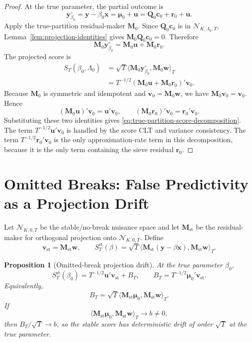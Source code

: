 \documentclass[12pt]{article}
\numberwithin{equation}{section}
\newtheorem{proposition}{Proposition}
\theoremstyle{definition}
\newcommand{\N}{\mathcal N}
\newcommand{\innerT}[2]{\langle #1,#2\rangle_T}
\begin{document}
\begin{proof}
At the true parameter, the partial outcome is
\[
    \bm y_{\beta_0}^\circ
    =\bm y-\beta_0\bm x
    =\bm\mu_0+\bm u
    =\bm Q_0\bm c_0+\bm r_0+\bm u.
\]
Apply the true-partition residual-maker \(\bm M_0\). Since \(\bm Q_0\bm c_0\) is
in \(\N_{K,\Lambda_0,T}\), Lemma~\ref{lem:projection-identities} gives
\(\bm M_0\bm Q_0\bm c_0=0\). Therefore
\[
    \bm M_0\bm y_{\beta_0}^\circ
    =\bm M_0\bm u+\bm M_0\bm r_0.
\]
The projected score is
\[
\begin{aligned}
    S_T(\beta_0,\Lambda_0)
    &=\sqrt T\innerT{\bm M_0\bm y_{\beta_0}^\circ}{\bm M_0\bm w} \\
    &=T^{-1/2}(\bm M_0\bm u+\bm M_0\bm r_0)'\bm v_0.
\end{aligned}
\]
Because \(\bm M_0\) is symmetric and idempotent and \(\bm v_0=\bm M_0\bm w\),
we have \(\bm M_0\bm v_0=\bm v_0\). Hence
\[
    (\bm M_0\bm u)'\bm v_0=\bm u'\bm v_0,
    \qquad
    (\bm M_0\bm r_0)'\bm v_0=\bm r_0'\bm v_0.
\]
Substituting these two identities gives
\eqref{eq:true-partition-score-decomposition}. The term
\(T^{-1/2}\bm u'\bm v_0\) is handled by the score CLT and variance consistency.
The term \(T^{-1/2}\bm r_0'\bm v_0\) is the only approximation-rate term in this
decomposition, because it is the only term containing the sieve residual
\(\bm r_0\).
\end{proof}
\section{Omitted Breaks: False Predictivity as a Projection Drift}

Let \(\N_{K,0,T}\) be the stable/no-break nuisance space and let
\(\bm M_{\mathrm{st}}\) be the residual-maker for orthogonal projection onto
\(\N_{K,0,T}\). Define
\[
    \bm v_{\mathrm{st}}=\bm M_{\mathrm{st}}\bm w,
    \qquad
    S_T^{\mathrm{st}}(\beta)
    =\sqrt T\innerT{\bm M_{\mathrm{st}}(\bm y-\beta\bm x)}
                         {\bm M_{\mathrm{st}}\bm w}.
\]

\begin{proposition}[Omitted-break projection drift]
\label{prop:omitted-break-projection-drift}
At the true parameter \(\beta_0\),
\begin{equation}
    S_T^{\mathrm{st}}(\beta_0)
    =
    T^{-1/2}\bm u'\bm v_{\mathrm{st}}
    +B_T,
    \qquad
    B_T=T^{-1/2}\bm\mu_0'\bm v_{\mathrm{st}}.
    \label{eq:stable-score-drift-decomposition}
\end{equation}
Equivalently,
\begin{equation}
    B_T
    =
    \sqrt T
    \innerT{\bm M_{\mathrm{st}}\bm\mu_0}
           {\bm M_{\mathrm{st}}\bm w}.
    \label{eq:stable-score-drift-inner-product}
\end{equation}
If
\[
    \innerT{\bm M_{\mathrm{st}}\bm\mu_0}
           {\bm M_{\mathrm{st}}\bm w}
    \to b\ne0,
\]
then \(B_T/\sqrt T\to b\), so the stable score has deterministic drift of
order \(\sqrt T\) at the true parameter.
\end{proposition}
\end{document}
